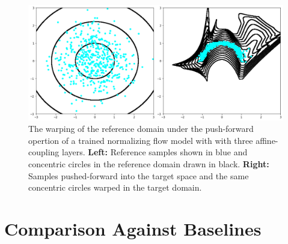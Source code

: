 \begin{figure}[htbp]
    \caption[Illustration of domain warping for synthetic 2-d distribution]{
        The warping of the reference domain under the push-forward opertion of a trained normalizing flow model with
        with three affine-coupling layers.
        \textbf{Left:} Reference samples shown in blue and concentric circles in the reference domain
        drawn in black.
        \textbf{Right:} Samples pushed-forward into the target space and the same concentric circles
        warped in the target domain.
    }
    \begin{center}
        \setlength{\fboxsep}{0pt}%
        \setlength{\fboxrule}{1pt}%
        \includegraphics[width=120mm]{figs/nf_circs_cropped}
    \end{center}
    \label{fig:flow_circs}
\end{figure}

\section{Comparison Against Baselines}\label{sec:comparison-against-baselines}

